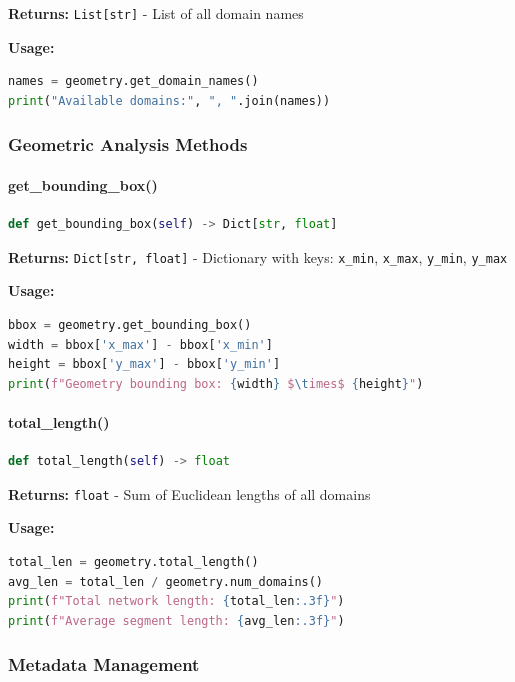 \textbf{Returns:} \texttt{List[str]} - List of all domain names

\textbf{Usage:}
\begin{lstlisting}[language=Python]
names = geometry.get_domain_names()
print("Available domains:", ", ".join(names))
\end{lstlisting}

\subsubsection{Geometric Analysis Methods}

\paragraph{get\_bounding\_box()}\leavevmode
\begin{lstlisting}[language=Python, caption=Bounding Box Calculation]
def get_bounding_box(self) -> Dict[str, float]
\end{lstlisting}

\textbf{Returns:} \texttt{Dict[str, float]} - Dictionary with keys: \texttt{x\_min}, \texttt{x\_max}, \texttt{y\_min}, \texttt{y\_max}

\textbf{Usage:}
\begin{lstlisting}[language=Python]
bbox = geometry.get_bounding_box()
width = bbox['x_max'] - bbox['x_min']
height = bbox['y_max'] - bbox['y_min']
print(f"Geometry bounding box: {width} $\times$ {height}")
\end{lstlisting}

\paragraph{total\_length()}\leavevmode
\begin{lstlisting}[language=Python, caption=Total Length Calculation]
def total_length(self) -> float
\end{lstlisting}

\textbf{Returns:} \texttt{float} - Sum of Euclidean lengths of all domains

\textbf{Usage:}
\begin{lstlisting}[language=Python]
total_len = geometry.total_length()
avg_len = total_len / geometry.num_domains()
print(f"Total network length: {total_len:.3f}")
print(f"Average segment length: {avg_len:.3f}")
\end{lstlisting}

\subsubsection{Metadata Management}


